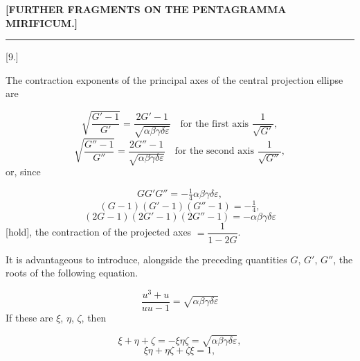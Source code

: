 
\begin{center}\textbf{[FURTHER FRAGMENTS ON THE PENTAGRAMMA MIRIFICUM.]}\end{center}

\begin{center}\rule{1.5cm}{.4pt}\end{center}

\begin{center}[9.]\end{center}

The contraction exponents of the principal axes of the central projection ellipse are

\[
\sqrt{\dfrac{G'-1}{G'}} = \dfrac{2G'-1}{\sqrt{\alpha\beta\gamma\delta\varepsilon}} \quad \text{for the first axis } \dfrac{1}{\sqrt{G'}},
\]
\[
\sqrt{\dfrac{G''-1}{G''}} = \dfrac{2G''-1}{\sqrt{\alpha\beta\gamma\delta\varepsilon}} \quad \text{for the second axis } \dfrac{1}{\sqrt{G''}},
\]
or, since

\[
GG'G'' = -\tfrac14 \alpha\beta\gamma\delta\varepsilon,
\]
\[
(G-1)(G'-1)(G''-1) = -\tfrac14,
\]
\[
(2G-1)(2G'-1)(2G''-1) = -\alpha\beta\gamma\delta\varepsilon
\]
[hold], the contraction of the projected axes $= \dfrac{1}{1-2G}$.

It is advantageous to introduce, alongside the preceding quantities $G$, $G'$, $G''$, the roots of the following equation.

\[
\frac{u^3+u}{uu-1} = \sqrt{\alpha\beta\gamma\delta\varepsilon}
\]
If these are $\xi$, $\eta$, $\zeta$, then

\[
\xi+\eta+\zeta = -\xi\eta\zeta = \sqrt{\alpha\beta\gamma\delta\varepsilon},
\]
\[
\xi\eta+\eta\zeta+\zeta\xi = 1,
\]
